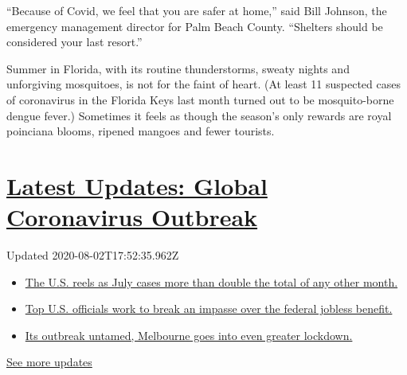 ``Because of Covid, we feel that you are safer at home,'' said Bill
Johnson, the emergency management director for Palm Beach County.
``Shelters should be considered your last resort.''

Summer in Florida, with its routine thunderstorms, sweaty nights and
unforgiving mosquitoes, is not for the faint of heart. (At least 11
suspected cases of coronavirus in the Florida Keys last month turned out
to be mosquito-borne dengue fever.) Sometimes it feels as though the
season's only rewards are royal poinciana blooms, ripened mangoes and
fewer tourists.

\hypertarget{latest-updates-global-coronavirus-outbreak}{%
\section{\texorpdfstring{\href{https://www.nytimes3xbfgragh.onion/2020/08/01/world/coronavirus-covid-19.html?action=click\&pgtype=Article\&state=default\&region=MAIN_CONTENT_1\&context=storylines_live_updates}{Latest
Updates: Global Coronavirus
Outbreak}}{Latest Updates: Global Coronavirus Outbreak}}\label{latest-updates-global-coronavirus-outbreak}}

Updated 2020-08-02T17:52:35.962Z

\begin{itemize}
\tightlist
\item
  \href{https://www.nytimes3xbfgragh.onion/2020/08/01/world/coronavirus-covid-19.html?action=click\&pgtype=Article\&state=default\&region=MAIN_CONTENT_1\&context=storylines_live_updates\#link-34047410}{The
  U.S. reels as July cases more than double the total of any other
  month.}
\item
  \href{https://www.nytimes3xbfgragh.onion/2020/08/01/world/coronavirus-covid-19.html?action=click\&pgtype=Article\&state=default\&region=MAIN_CONTENT_1\&context=storylines_live_updates\#link-780ec966}{Top
  U.S. officials work to break an impasse over the federal jobless
  benefit.}
\item
  \href{https://www.nytimes3xbfgragh.onion/2020/08/01/world/coronavirus-covid-19.html?action=click\&pgtype=Article\&state=default\&region=MAIN_CONTENT_1\&context=storylines_live_updates\#link-2bc8948}{Its
  outbreak untamed, Melbourne goes into even greater lockdown.}
\end{itemize}

\href{https://www.nytimes3xbfgragh.onion/2020/08/01/world/coronavirus-covid-19.html?action=click\&pgtype=Article\&state=default\&region=MAIN_CONTENT_1\&context=storylines_live_updates}{See
more updates}

